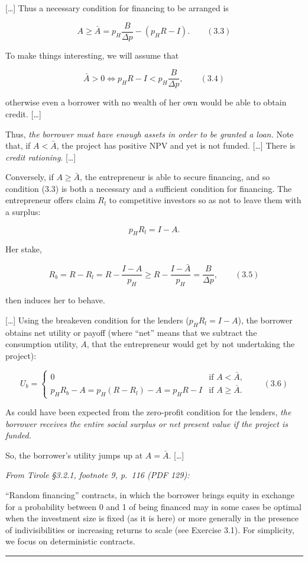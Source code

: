 \documentclass[11pt,a4paper]{article}
\newcommand{\stmtend}{\par\endgroup\nopagebreak\noindent\rule{\linewidth}{0.4pt}\par\medskip}
\begin{document}
{[}\ldots{]} Thus a necessary condition for financing to be arranged is

\[A \geqslant \bar A = p_H \frac{B}{\Delta p} - (p_H R - I). \qquad (3.3)\]

To make things interesting, we will assume that

\[\bar A > 0 \iff p_H R - I < p_H \frac{B}{\Delta p}, \qquad (3.4)\]

otherwise even a borrower with no wealth of her own would be able to obtain credit. {[}\ldots{]}

Thus, \emph{the borrower must have enough assets in order to be granted a loan.} Note that, if
\(A < \bar A\), the project has positive NPV and yet is not funded. {[}\ldots{]} There is
\emph{credit rationing}. {[}\ldots{]}

Conversely, if \(A \geqslant \bar A\), the entrepreneur is able to secure financing, and so
condition (3.3) is both a necessary and a sufficient condition for financing. The entrepreneur
offers claim \(R_l\) to competitive investors so as not to leave them with a surplus:

\[p_H R_l = I - A.\]

Her stake,

\[R_b = R - R_l = R - \frac{I - A}{p_H} \geqslant R - \frac{I - \bar A}{p_H} = \frac{B}{\Delta p}, \qquad (3.5)\]

then induces her to behave.

{[}\ldots{]} Using the breakeven condition for the lenders (\(p_H R_l = I - A\)), the borrower
obtains net utility or payoff (where ``net'' means that we subtract the consumption utility, \(A\),
that the entrepreneur would get by not undertaking the project):

\[U_b = \begin{cases} 0 & \text{if } A < \bar A, \\ p_H R_b - A = p_H(R - R_l) - A = p_H R - I & \text{if } A \geqslant \bar A. \end{cases} \qquad (3.6)\]

As could have been expected from the zero-profit condition for the lenders, \emph{the borrower
receives the entire social surplus or net present value if the project is funded.}

So, the borrower's utility jumps up at \(A = \bar A\). {[}\ldots{]}

\emph{From Tirole §3.2.1, footnote 9, p.~116 (PDF 129):}

``Random financing'' contracts, in which the borrower brings equity in exchange for a probability
between 0 and 1 of being financed may in some cases be optimal when the investment size is fixed (as
it is here) or more generally in the presence of indivisibilities or increasing returns to scale
(see Exercise 3.1). For simplicity, we focus on deterministic contracts.
\stmtend
\end{document}
